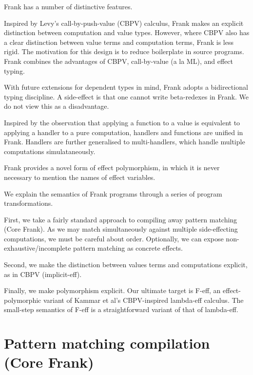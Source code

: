\documentclass[preprint]{sigplanconf}
\begin{document}
Frank has a number of distinctive features.

Inspired by Levy's call-by-push-value (CBPV) calculus, Frank makes an
explicit distinction between computation and value types. However,
where CBPV also has a clear distinction between value terms and
computation terms, Frank is less rigid. The motivation for this design
is to reduce boilerplate in source programs. Frank combines the
advantages of CBPV, call-by-value (a la ML), and effect typing.

With future extensions for dependent types in mind, Frank adopts a
bidirectional typing discipline. A side-effect is that one cannot
write beta-redexes in Frank. We do not view this as a disadvantage.

Inspired by the observation that applying a function to a value is
equivalent to applying a handler to a pure computation, handlers and
functions are unified in Frank. Handlers are further generalised to
multi-handlers, which handle multiple computations simulataneously.

Frank provides a novel form of effect polymorphism, in which it is
never necessary to mention the names of effect variables.

We explain the semantics of Frank programs through a series of program
transformations.

First, we take a fairly standard approach to compiling away pattern
matching (Core Frank). As we may match simultaneously against multiple
side-effecting computations, we must be careful about
order. Optionally, we can expose non-exhaustive/incomplete pattern
matching as concrete effects.

Second, we make the distinction between values terms and computations
explicit, as in CBPV (implicit-eff).

Finally, we make polymorphism explicit. Our ultimate target is F-eff,
an effect-polymorphic variant of Kammar et al's CBPV-inspired
lambda-eff calculus. The small-step semantics of F-eff is a
straightforward variant of that of lambda-eff.






\section{Pattern matching compilation (Core Frank)}
\end{document}
